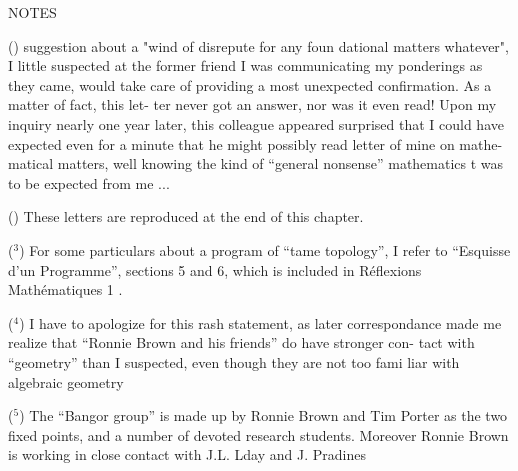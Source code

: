 
NOTES 


()   suggestion about  a "wind of disrepute for any foun%
\hand{-}dational matters whatever", I little suspected at the former friend  
I was  communicating my ponderings as they came, would take care of 
providing a most unexpected confirmation. As a matter of fact, this let-%
ter never got an answer, nor was it even read! Upon my inquiry nearly one
year later, this colleague appeared  surprised that  I could have expected
even for a minute that he might possibly read   letter of mine on mathe-%
matical matters, well knowing the kind of ``general nonsense'' mathematics
t was to be expected from me ...

() These letters are reproduced  at the end of this chapter.

($^3$) For some particulars about a program of ``tame topology'', I refer to
``Esquisse d'un Programme'', sections 5 and 6, which is included in
Réflexions Mathématiques 1 .

($^4$) I have to apologize for this rash statement, as later correspondance
made me realize that ``Ronnie Brown and his friends'' do have stronger con-%
tact with ``geometry'' than I suspected, even though they are not too fami\hand{\unsure{-}}%
liar with algebraic geometry\hand{!}

($^5$) The ``Bangor group'' is made up by Ronnie Brown and Tim Porter as the
two fixed points, and a number of devoted research students. Moreover
Ronnie Brown is working in close contact with J.L. Lday and J. Pradines

